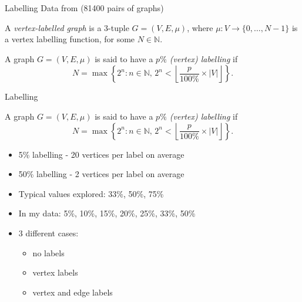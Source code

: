 \documentclass{beamer}
\DeclareMathOperator{\E}{E}
\begin{document}
\begin{frame}{Labelling}
  Data from \cite{foggia2001-2, DBLP:journals/prl/SantoFSV03}
  (\num{81400} pairs of graphs)
  \pause
  \begin{definition}
    A \emph{vertex-labelled graph} is a 3-tuple $G = (V, E, \mu)$, where $\mu
    \colon V \to \{ 0, \dots, N - 1 \}$ is a vertex labelling function, for some
    $N \in \mathbb{N}$.
  \end{definition}
  \pause
  \begin{definition}
    A graph $G = (V, E, \mu)$ is said to have a \emph{$p\%$ (vertex) labelling} if
    \[ N = \max \left\{ 2^n : n \in \mathbb{N},\, 2^n < \left\lfloor \frac{p}{100\%}
          \times |V| \right\rfloor \right\}. \]
  \end{definition}
\end{frame}

\begin{frame}{Labelling}
  \begin{definition}
    A graph $G = (V, E, \mu)$ is said to have a \emph{$p\%$ (vertex) labelling} if
    \[ N = \max \left\{ 2^n : n \in \mathbb{N},\, 2^n < \left\lfloor \frac{p}{100\%}
          \times |V| \right\rfloor \right\}. \]
  \end{definition}
  \begin{itemize}
  \item 5\% labelling - 20 vertices per label on average
  \item 50\% labelling - 2 vertices per label on average
    \pause
  \item Typical values explored: 33\%, 50\%, 75\%
    \pause
  \item In my data: 5\%, 10\%, 15\%, 20\%, 25\%, 33\%, 50\%
    \pause
  \item 3 different cases:
    \begin{itemize}
    \item no labels
    \item vertex labels
    \item vertex and edge labels
    \end{itemize}
  \end{itemize}
\end{frame}

\end{document}
